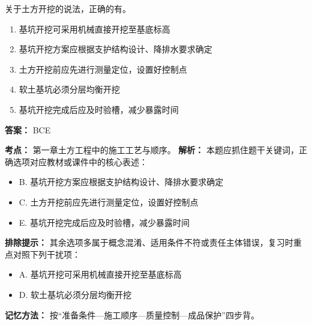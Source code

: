 \documentclass[UTF8,fontset=fandol,11pt]{ctexart}
\begin{document}
\begin{quizbox}[title={第 14 题}]
关于土方开挖的说法，正确的有。\\
\begin{enumerate}[label=\Alph*.]
\item 基坑开挖可采用机械直接开挖至基底标高
\item 基坑开挖方案应根据支护结构设计、降排水要求确定
\item 土方开挖前应先进行测量定位，设置好控制点
\item 软土基坑必须分层均衡开挖
\item 基坑开挖完成后应及时验槽，减少暴露时间
\end{enumerate}
\textbf{答案：} BCE
\vspace{0.25em}
\begin{answerbox}[title={考点解析}]
\textbf{考点：} 第一章土方工程中的施工工艺与顺序。
\textbf{解析：} 本题应抓住题干关键词，正确选项对应教材或课件中的核心表述：
\begin{itemize}
\item B. 基坑开挖方案应根据支护结构设计、降排水要求确定
\item C. 土方开挖前应先进行测量定位，设置好控制点
\item E. 基坑开挖完成后应及时验槽，减少暴露时间
\end{itemize}
\textbf{排除提示：} 其余选项多属于概念混淆、适用条件不符或责任主体错误，复习时重点对照下列干扰项：
\begin{itemize}
\item A. 基坑开挖可采用机械直接开挖至基底标高
\item D. 软土基坑必须分层均衡开挖
\end{itemize}
\textbf{记忆方法：} 按“准备条件—施工顺序—质量控制—成品保护”四步背。
\end{answerbox}
\end{quizbox}

\vspace{0.2em}
\end{document}

